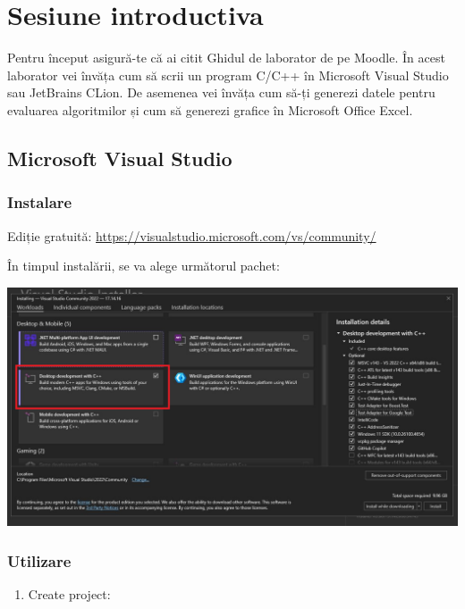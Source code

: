 \documentclass[../ro-fa-lab.tex]{subfiles}
\begin{document}
\section{\texorpdfstring{\textbf{Sesiune introductiva}}{Sesiune introductiva}}\label{intro-session}


Pentru început asigură-te că ai citit Ghidul de laborator de pe Moodle.
În acest laborator vei învăța cum să scrii un program C/C++ în Microsoft
Visual Studio sau JetBrains CLion. De asemenea vei învăța cum să-ți
generezi datele pentru evaluarea algoritmilor și cum să generezi grafice
în Microsoft Office Excel.

\subsection{Microsoft Visual Studio}\label{microsoft-visual-studio}

\subsubsection{Instalare}\label{instalare}

Ediție gratuită: \url{https://visualstudio.microsoft.com/vs/community/}

În timpul instalării, se va alege următorul pachet:

\includegraphics[width=\textwidth]{../Resources/lab0/vs_components.png}

\subsubsection{Utilizare}\label{utilizare}

\begin{enumerate}
\def\labelenumi{\arabic{enumi}.}
\item
    Create project:
\end{enumerate}
\end{document}
